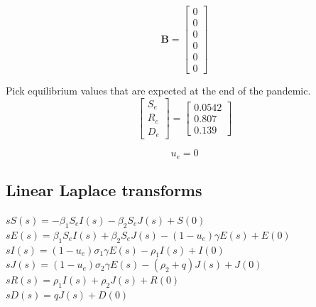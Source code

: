 \documentclass[fleqn]{article}
\begin{document}
\begin{equation*}
    \bm{B} = \begin{bmatrix}
        0 \\
        0 \\
        0 \\
        0 \\
        0 \\
        0
    \end{bmatrix}
\end{equation*}

Pick equilibrium values that are expected at the end of the pandemic.
\begin{equation*}
    \begin{bmatrix}
        S_e \\
        R_e \\
        D_e
    \end{bmatrix} = \begin{bmatrix}
        0.0542 \\
        0.807 \\
        0.139
    \end{bmatrix}
\end{equation*}

\begin{equation*}
    u_e = 0
\end{equation*}

\subsection*{Linear Laplace transforms}
$sS(s) = -\beta_1 S_e I(s) - \beta_2 S_e J(s) + S(0)$ \\
$sE(s) = \beta_1 S_e I(s) + \beta_2 S_e J(s) - (1-u_e) \gamma E(s) + E(0)$ \\
$sI(s) = (1-u_e) \sigma_1 \gamma E(s) - \rho_1 I(s) + I(0)$ \\
$sJ(s) = (1-u_e) \sigma_2 \gamma E(s) - (\rho_2 + q) J(s) + J(0)$ \\
$sR(s) = \rho_1 I(s) + \rho_2 J(s) + R(0)$ \\
$sD(s) = qJ(s) + D(0)$ \\

\newpage
\end{document}
